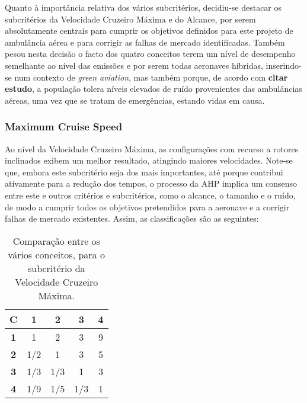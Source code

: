 Quanto à importância relativa dos vários subcritérios, decidiu-se destacar os subcritérios da Velocidade Cruzeiro Máxima e do Alcance, por serem absolutamente centrais para cumprir os objetivos definidos para este projeto de ambulância aérea e para corrigir as falhas de mercado identificadas. Também pesou nesta decisão o facto dos quatro conceitos terem um nível de desempenho semelhante ao nível das emissões e por serem todas aeronaves híbridas, inserindo-se num contexto de \textit{green aviation}, mas também porque, de acordo com \textbf{citar estudo}, a população tolera níveis elevados de ruído provenientes das ambulâncias aéreas, uma vez que se tratam de emergências, estando vidas em causa.




\subsubsection{Maximum Cruise Speed}

Ao nível da Velocidade Cruzeiro Máxima, as configurações com recurso a rotores inclinados exibem um melhor resultado, atingindo maiores velocidades. Note-se que, embora este subcritério seja dos mais importantes, até porque contribui ativamente para a redução dos tempos, o processo da AHP implica um consenso entre este e outros critérios e subcritérios, como o alcance, o tamanho e o ruído, de modo a cumprir todos os objetivos pretendidos para a aeronave e a corrigir falhas de mercado existentes. Assim, as classificações são as seguintes:



\begin{table}[H]
\begin{center}
\caption{Comparação entre os vários conceitos, para o subcritério da Velocidade Cruzeiro Máxima.}
\begin{tabular}{ |c|c c c c| }
 \hline
 \textbf{C} & \textbf{1} & \textbf{2} & \textbf{3} & \textbf{4}  \\
\hline
 \textbf{1} & 1 & 2 & 3 & 9 \\
 \textbf{2} & 1/2 & 1 & 3 & 5  \\
 \textbf{3} & 1/3 & 1/3 & 1 & 3  \\
 \textbf{4} & 1/9 & 1/5 & 1/3 & 1  \\
\hline
\end{tabular}
\end{center}
\end{table}









